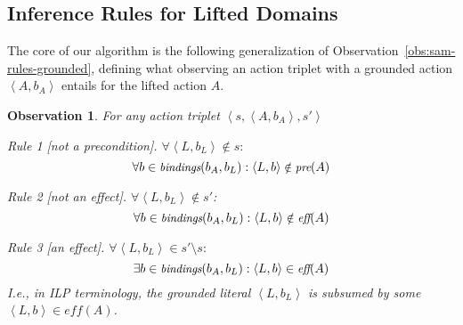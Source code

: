 \documentclass{article}
\newtheorem{observation}{Observation}
\newcommand{\tuple}[1]{\ensuremath{\left \langle #1 \right \rangle }}
\newcommand{\pre}{\textit{pre}}
\newcommand{\eff}{\textit{eff}}
\newcommand{\liftl}{L}
\newcommand{\lifta}{A}
\newcommand{\bindings}{\textit{bindings}}
\begin{document}








\subsection{Inference Rules for Lifted Domains}
The core of our algorithm is the following generalization of Observation~\ref{obs:sam-rules-grounded}, 
defining what observing an action triplet with a grounded action $\tuple{\lifta, b_\lifta}$ entails for the lifted action $\lifta$.
\begin{observation}\label{obs:sam-rules-lifted-general}
For any action triplet $\tuple{s, \tuple{\lifta, b_\lifta}, s'}$%
\begin{compactitem}
    \item Rule 1 [not a precondition].  
    $\forall \tuple{\liftl, b_\liftl} \notin s:$
    \begin{equation}\small
     \forall b\in \bindings(b_\lifta, b_\liftl): 
     \tuple{\liftl,b} \notin \pre(\lifta)
    \end{equation}
    \item Rule 2 [not an effect].  
    $\forall \tuple{\liftl, b_\liftl} \notin s'$:
    \begin{equation}\small
     \forall b\in \bindings(b_\lifta, b_\liftl): 
     \tuple{\liftl,b} \notin \eff(\lifta)
    \end{equation}
    \item Rule 3 [an effect]. 
    $\forall \tuple{\liftl,b_\liftl} \in s'\setminus s:$
    \begin{equation}\small
    \exists b\in\bindings(b_\lifta, b_\liftl): 
    \tuple{\liftl,b} \in \eff(\lifta)
    \end{equation}
    I.e., in ILP terminology, the grounded literal $\tuple{\liftl,b_\liftl}$ is \emph{subsumed} by some $\tuple{\liftl,b} \in \eff(\lifta)$.
\end{compactitem}
\end{observation}
\end{document}

